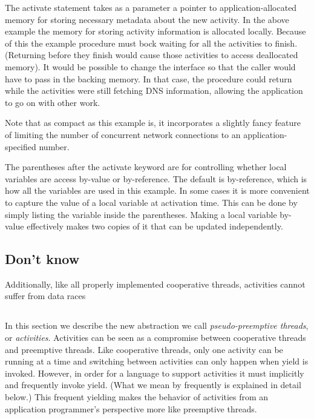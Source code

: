 \documentclass[10pt,preprint]{sigplanconf}
\begin{document}
The activate statement takes as a parameter a pointer to application-allocated memory for storing necessary metadata about the new activity.
In the above example the memory for storing activity information is allocated locally.
Because of this the example procedure must bock waiting for all the activities to finish.
(Returning before they finish would cause those activities to access deallocated memory).
It would be possible to change the interface so that the caller would have to pass in the backing memory.
In that case, the procedure could return while the activities were still fetching DNS information, allowing the application to go on with other work.

Note that as compact as this example is, it incorporates a slightly fancy feature of limiting the number of concurrent network connections to an application-specified number.

The parentheses after the activate keyword are for controlling whether local variables are access by-value or by-reference.
The default is by-reference, which is how all the variables are used in this example.
In some cases it is more convenient to capture the value of a local variable at activation time.
This can be done by simply listing the variable inside the parentheses.
Making a local variable by-value effectively makes two copies of it that can be updated independently.

\subsection{Don't know}

Additionally, like all properly implemented cooperative threads, activities cannot suffer from data races

\cite{Boehm2011}


\subsection{}

In this section we describe the new abstraction we call \emph{pseudo-preemptive threads}, or \emph{activities}.
Activities can be seen as a compromise between cooperative threads and preemptive threads.
Like cooperative threads, only one activity can be running at a time and switching between activities can only happen when yield is invoked.
However, in order for a language to support activities it must implicitly and frequently invoke yield.
(What we mean by frequently is explained in detail below.)
This frequent yielding makes the behavior of activities from an application programmer's perspective more like preemptive threads.
\end{document}
